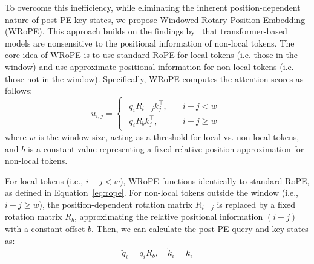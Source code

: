 To overcome this inefficiency, while eliminating the inherent position-dependent nature of post-PE key states, 
we propose Windowed Rotary Position Embedding (WRoPE).
This approach builds on the findings by~\citet{rerope, rerope-blog} that transformer-based models are nonsensitive to the positional information of non-local tokens.
The core idea of WRoPE is to use standard RoPE for local tokens (i.e. those in the window) and use approximate positional information for non-local tokens (i.e. those not in the window).
Specifically, WRoPE computes the attention scores as follows:
\begin{equation}
    \label{eq:wrope}
    u_{i,j} = 
    \begin{cases}
        \begin{aligned}
            q_i R_{i-j} k_j^\top, \quad & i-j < w \\
            q_i R_b k_j^\top, \quad & i-j \ge w
        \end{aligned}
    \end{cases}
\end{equation}
where \(w\) is the window size, acting as a threshold for local vs. non-local tokens, and \(b\) is a constant value representing a fixed relative position approximation for non-local tokens.

For local tokens (i.e., \(i - j < w\)), WRoPE functions identically to standard RoPE, as defined in Equation~\ref{eq:rope}.
For non-local tokens outside the window (i.e., \(i - j \ge w\)), the position-dependent rotation matrix \(R_{i-j}\) is replaced by a fixed rotation matrix \(R_b\), approximating the relative positional information \( (i-j) \) with a constant offset \(b\).
Then, we can calculate the post-PE query and key states as:
\begin{equation}
    \tilde q_i = q_iR_b, \quad \tilde k_i = k_i
\end{equation}

